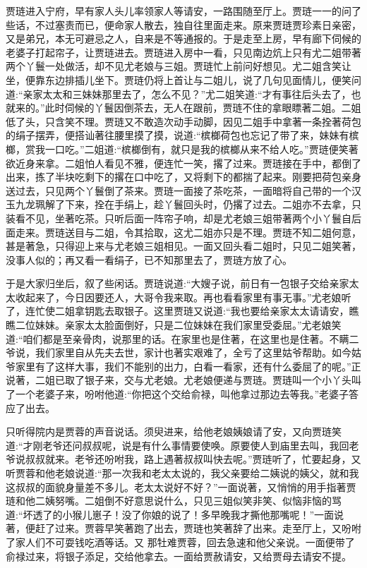\begin{parag}
    贾琏进入宁府，早有家人头儿率领家人等请安，一路围随至厅上。贾琏一一的问了些话，不过塞责而已，便命家人散去，独自往里面走来。原来贾琏贾珍素日亲密，又是弟兄，本无可避忌之人，自来是不等通报的。于是走至上房，早有廊下伺候的老婆子打起帘子，让贾琏进去。贾琏进入房中一看，只见南边炕上只有尤二姐带著两个丫鬟一处做活，却不见尤老娘与三姐。贾琏忙上前问好想见。尤二姐含笑让坐，便靠东边排插儿坐下。贾琏仍将上首让与二姐儿，说了几句见面情儿，便笑问道:“亲家太太和三妹妹那里去了，怎么不见？”尤二姐笑道:“才有事往后头去了，也就来的。”此时伺候的丫鬟因倒茶去，无人在跟前，贾琏不住的拿眼瞟著二姐。二姐低了头，只含笑不理。贾琏又不敢造次动手动脚，因见二姐手中拿著一条拴著荷包的绢子摆弄，便搭讪著往腰里摸了摸，说道:“槟榔荷包也忘记了带了来，妹妹有槟榔，赏我一口吃。”二姐道:“槟榔倒有，就只是我的槟榔从来不给人吃。”贾琏便笑著欲近身来拿。二姐怕人看见不雅，便连忙一笑，撂了过来。贾琏接在手中，都倒了出来，拣了半块吃剩下的撂在口中吃了，又将剩下的都揣了起来。刚要把荷包亲身送过去，只见两个丫鬟倒了茶来。贾琏一面接了茶吃茶，一面暗将自己带的一个汉玉九龙珮解了下来，拴在手绢上，趁丫鬟回头时，仍撂了过去。二姐亦不去拿，只装看不见，坐著吃茶。只听后面一阵帘子响，却是尤老娘三姐带著两个小丫鬟自后面走来。贾琏送目与二姐，令其拾取，这尤二姐亦只是不理。贾琏不知二姐何意，甚是著急，只得迎上来与尤老娘三姐相见。一面又回头看二姐时，只见二姐笑著，没事人似的；再又看一看绢子，已不知那里去了，贾琏方放了心。
\end{parag}


\begin{parag}
    于是大家归坐后，叙了些闲话。贾琏说道:“大嫂子说，前日有一包银子交给亲家太太收起来了，今日因要还人，大哥令我来取。再也看看家里有事无事。”尤老娘听了，连忙使二姐拿钥匙去取银子。这里贾琏又说道:“我也要给亲家太太请请安，瞧瞧二位妹妹。亲家太太脸面倒好，只是二位妹妹在我们家里受委屈。”尤老娘笑道:“咱们都是至亲骨肉，说那里的话。在家里也是住著，在这里也是住著。不瞒二爷说，我们家里自从先夫去世，家计也著实艰难了，全亏了这里姑爷帮助。如今姑爷家里有了这样大事，我们不能别的出力，白看一看家，还有什么委屈了的呢。”正说著，二姐已取了银子来，交与尤老娘。尤老娘便递与贾琏。贾琏叫一个小丫头叫了一个老婆子来，吩咐他道:“你把这个交给俞禄，叫他拿过那边去等我。”老婆子答应了出去。
\end{parag}


\begin{parag}
    只听得院内是贾蓉的声音说话。须臾进来，给他老娘姨娘请了安，又向贾琏笑道:“才刚老爷还问叔叔呢，说是有什么事情要使唤。原要使人到庙里去叫，我回老爷说叔叔就来。老爷还吩咐我，路上遇著叔叔叫快去呢。”贾琏听了，忙要起身，又听贾蓉和他老娘说道:“那一次我和老太太说的，我父亲要给二姨说的姨父，就和我这叔叔的面貌身量差不多儿。老太太说好不好？”一面说著，又悄悄的用手指著贾琏和他二姨努嘴。二姐倒不好意思说什么，只见三姐似笑非笑、似恼非恼的骂道:“坏透了的小猴儿崽子！没了你娘的说了！多早晚我才撕他那嘴呢！”一面说著，便赶了过来。贾蓉早笑著跑了出去，贾琏也笑著辞了出来。走至厅上，又吩咐了家人们不可耍钱吃酒等话。又 那牡难贾蓉，回去急速和他父亲说。一面便带了俞禄过来，将银子添足，交给他拿去。一面给贾赦请安，又给贾母去请安不提。
\end{parag}


